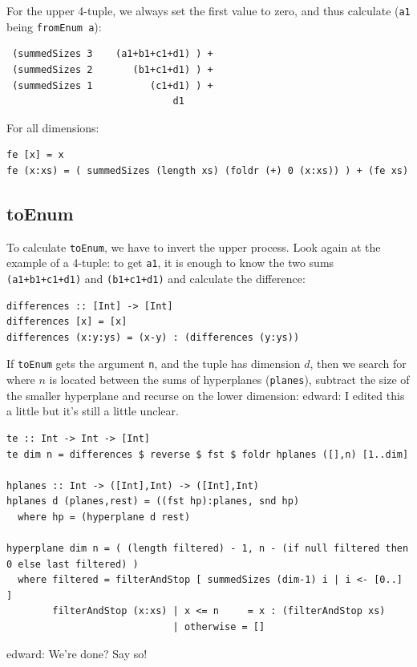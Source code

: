 \documentclass{tmr}
\newcommand{\authornote}[3]{{\color{#2} {\sc #1}: #3}}
\newcommand\bay[1]{\authornote{edward}{blue}{#1}}
\begin{document}
For the upper 4-tuple, we always set the first value to zero, and thus calculate (\verb|a1| being \verb|fromEnum a|):

\begin{Verbatim}
 (summedSizes 3    (a1+b1+c1+d1) ) +
 (summedSizes 2       (b1+c1+d1) ) +
 (summedSizes 1          (c1+d1) ) +
                             d1
\end{Verbatim}

For all dimensions:
\begin{Verbatim}
fe [x] = x
fe (x:xs) = ( summedSizes (length xs) (foldr (+) 0 (x:xs)) ) + (fe xs)
\end{Verbatim}

\subsection {toEnum }
To calculate \verb|toEnum|, we have to invert the upper process. Look again at the example of a 4-tuple: to get \verb|a1|, it is enough to know the two sums \verb|(a1+b1+c1+d1)| and \verb|(b1+c1+d1)| and calculate the difference:

\begin{Verbatim}
differences :: [Int] -> [Int]
differences [x] = [x]
differences (x:y:ys) = (x-y) : (differences (y:ys))
\end{Verbatim}

If \verb|toEnum| gets the argument \verb|n|, and the tuple has dimension $d$, then we search for where $n$ is located between the sums of hyperplanes (\verb|planes|), subtract the size of the smaller hyperplane and recurse on the lower dimension: \bay{I edited this a little but it's still a little unclear.}

\begin{Verbatim}
te :: Int -> Int -> [Int]
te dim n = differences $ reverse $ fst $ foldr hplanes ([],n) [1..dim]

hplanes :: Int -> ([Int],Int) -> ([Int],Int)
hplanes d (planes,rest) = ((fst hp):planes, snd hp)
  where hp = (hyperplane d rest)

hyperplane dim n = ( (length filtered) - 1, n - (if null filtered then 0 else last filtered) )
  where filtered = filterAndStop [ summedSizes (dim-1) i | i <- [0..] ]
        filterAndStop (x:xs) | x <= n     = x : (filterAndStop xs)
                             | otherwise = []
\end{Verbatim}

\bay{We're done? Say so!}
\end{document}
